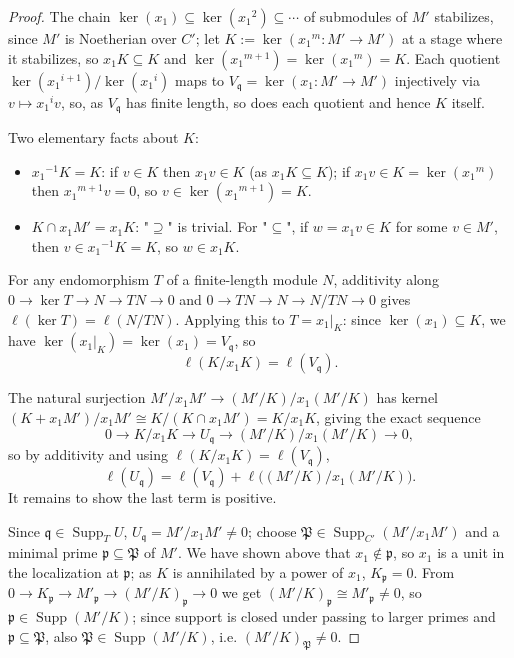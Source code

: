 \documentclass[11pt]{amsart}
\numberwithin{equation}{section}
\theoremstyle{plain}
\theoremstyle{remark}
\begin{document}
\begin{proof}
The chain $\ker({x_1})\subseteq\ker({x_1}^2)\subseteq\cdots$ of
submodules of $M'$ stabilizes, since $M'$ is Noetherian over $C'$; let
$K:=\ker({x_1}^m:M'\to M')$ at a stage where it stabilizes, so ${x_1}K\subseteq K$ and
$\ker({x_1}^{m+1})=\ker({x_1}^m)=K$. Each quotient $\ker({x_1}^{i+1})/\ker({x_1}^i)$ maps to
$V_{\mathfrak q}=\ker({x_1}:M'\to M')$ injectively via $v\mapsto {x_1}^iv$, so, as $V_{\mathfrak q}$ has
finite length, so does each quotient and hence $K$ itself.

Two elementary facts about $K$:
\begin{itemize}
\item ${x_1}^{-1}K=K$: if $v\in K$ then ${x_1}v\in K$ (as ${x_1}K\subseteq K$); if ${x_1}v\in K=\ker({x_1}^m)$
then ${x_1}^{m+1}v=0$, so $v\in\ker({x_1}^{m+1})=K$.
\item $K\cap {x_1}M'={x_1}K$: "$\supseteq$" is trivial. For "$\subseteq$", if $w={x_1}v\in K$ for
some $v\in M'$, then $v\in {x_1}^{-1}K=K$, so $w\in {x_1}K$.
\end{itemize}

For any endomorphism $T$ of a finite-length module $N$,
additivity along $0\to\ker T\to N\to TN\to0$ and $0\to TN\to N\to N/TN\to0$ gives
$\ell(\ker T)=\ell(N/TN)$. Applying this to $T={x_1}|_K$: since $\ker({x_1})\subseteq K$, we
have $\ker({x_1}|_K)=\ker({x_1})=V_{\mathfrak q}$, so
\[\ell(K/{x_1}K)=\ell(V_{\mathfrak q}).\]

The natural surjection $M'/{x_1}M'\to(M'/K)/{x_1}(M'/K)$ has
kernel $(K+{x_1}M')/{x_1}M'\cong K/(K\cap {x_1}M')=K/{x_1}K$, giving the exact sequence
\[0\longrightarrow K/{x_1}K\longrightarrow U_{\mathfrak q}\longrightarrow
 (M'/K)/{x_1}(M'/K)\longrightarrow0,\]
so by additivity and using $\ell(K/{x_1}K)=\ell(V_{\mathfrak q})$,
\[\ell(U_{\mathfrak q}) = \ell(V_{\mathfrak q}) + \ell\bigl((M'/K)/{x_1}(M'/K)\bigr).\]
It remains to show the last term is positive.

Since $\mathfrak q\in\operatorname{Supp}_TU$,
$U_{\mathfrak q}=M'/{x_1}M'\ne0$; choose $\mathfrak P\in\operatorname{Supp}_{C'}(M'/{x_1}M')$
and a minimal prime $\mathfrak p\subseteq\mathfrak P$ of $M'$. We have shown above that ${x_1}\notin\mathfrak p$, so ${x_1}$ is a unit in the localization at $\mathfrak
p$; as $K$ is annihilated by a power of ${x_1}$, $K_{\mathfrak p}=0$. From
$0\to K_{\mathfrak p}\to M'_{\mathfrak p}\to(M'/K)_{\mathfrak p}\to0$ we get
$(M'/K)_{\mathfrak p}\cong M'_{\mathfrak p}\ne0$, so $\mathfrak p\in
\operatorname{Supp}(M'/K)$; since support is closed under passing to larger primes and
$\mathfrak p\subseteq\mathfrak P$, also $\mathfrak P\in\operatorname{Supp}(M'/K)$, i.e.
$(M'/K)_{\mathfrak P}\ne0$.


\end{proof}
\end{document}

